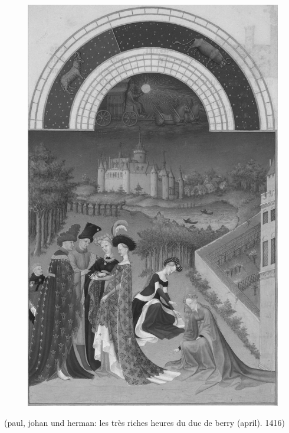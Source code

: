 \documentclass[12pt,a4paper,british,landscape]{article}
\begin{document}
\begin{figure}[h]
    \vspace{1cm}
    \begin{center}
        \includegraphics[scale=0.257]{april-grey.jpeg}
    \end{center}
\end{figure}

\begin{center}
    (paul, johan und herman: les très riches heures du duc de berry (april). 1416)
\end{center}
\end{document}
